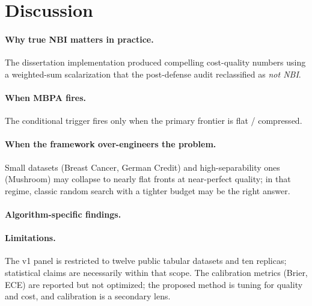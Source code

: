 \section{Discussion}\label{sec:discussion}


\paragraph{Why true NBI matters in practice.} The dissertation
implementation \citep{ribeiro2026dissertation} produced compelling
cost-quality numbers using a weighted-sum scalarization that the
post-defense audit reclassified as \emph{not NBI}.

\paragraph{When MBPA fires.}
The conditional trigger fires only when the primary frontier is
flat / compressed. 

\paragraph{When the framework over-engineers the problem.}
Small datasets (Breast Cancer, German Credit) and high-separability
ones (Mushroom) may collapse to nearly flat fronts at near-perfect
quality; in that regime, classic random search with a tighter budget
may be the right answer. 

\paragraph{Algorithm-specific findings.}

\paragraph{Limitations.}
The v1 panel is restricted to twelve public tabular datasets and ten
replicas; statistical claims are necessarily within that scope. The
calibration metrics (Brier, ECE) are reported but not optimized; the
proposed method is tuning for quality and cost, and calibration is a
secondary lens.

